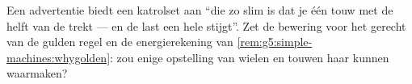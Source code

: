 \begin{exercise}[$\star\star$]\label{exo:g5:simple-machines:11}
Een advertentie biedt een katrolset aan ``die zo slim is dat je één
 touw met de helft van de  trekt --- en de last een hele
 stijgt''. Zet de bewering voor het gerecht van de gulden regel
en de energierekening van \cref{rem:g5:simple-machines:whygolden}: zou
enige opstelling van wielen en touwen haar kunnen waarmaken?
\end{exercise}
